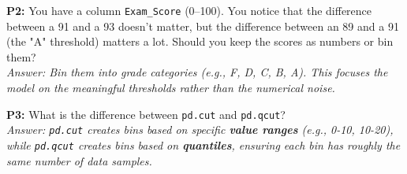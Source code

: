 \documentclass{article}
\begin{document}
\textbf{P2:} You have a column \texttt{Exam\_Score} (0--100). You notice that the difference between a 91 and a 93 doesn't matter, but the difference between an 89 and a 91 (the "A" threshold) matters a lot. Should you keep the scores as numbers or bin them? \\
\textit{Answer: Bin them into grade categories (e.g., F, D, C, B, A). This focuses the model on the meaningful thresholds rather than the numerical noise.}

\textbf{P3:} What is the difference between \texttt{pd.cut} and \texttt{pd.qcut}? \\
\textit{Answer: \texttt{pd.cut} creates bins based on specific \textbf{value ranges} (e.g., 0-10, 10-20), while \texttt{pd.qcut} creates bins based on \textbf{quantiles}, ensuring each bin has roughly the same number of data samples.}
\end{document}
